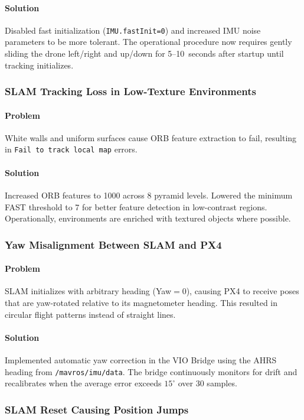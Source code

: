 \paragraph{Solution}
Disabled fast initialization (\texttt{IMU.fastInit=0}) and increased IMU noise parameters to be more tolerant. The operational procedure now requires gently sliding the drone left/right and up/down for 5--10~seconds after startup until tracking initializes.

\subsubsection{SLAM Tracking Loss in Low-Texture Environments}
\paragraph{Problem}
White walls and uniform surfaces cause ORB feature extraction to fail, resulting in \texttt{Fail to track local map} errors.
\paragraph{Solution}
Increased ORB features to 1000 across 8 pyramid levels. Lowered the minimum FAST threshold to 7 for better feature detection in low-contrast regions. Operationally, environments are enriched with textured objects where possible.

\subsubsection{Yaw Misalignment Between SLAM and PX4}
\paragraph{Problem}
SLAM initializes with arbitrary heading (Yaw$=0$), causing PX4 to receive poses that are yaw-rotated relative to its magnetometer heading. This resulted in circular flight patterns instead of straight lines.
\paragraph{Solution}
Implemented automatic yaw correction in the VIO Bridge using the AHRS heading from \texttt{/mavros/imu/data}. The bridge continuously monitors for drift and recalibrates when the average error exceeds $15^\circ$ over 30 samples.

\subsubsection{SLAM Reset Causing Position Jumps}
